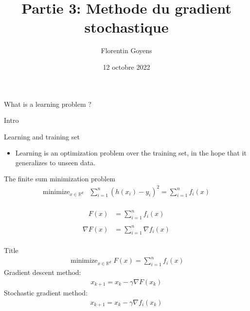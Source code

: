 \documentclass[10pt,serif]{beamer}
\title{Partie 3: Methode du gradient stochastique}
\date{12 octobre 2022}
\author{Florentin Goyens}
\newcommand{\Rd}{\mathbb{R}^d}
\newcommand{\minimize}{\operatorname{minimize}}
\begin{document}
\maketitle

\begin{frame}{What is a learning problem ? }

Intro 

\end{frame}


\begin{frame}{Learning and training set}
\begin{itemize}
\item Learning is an optimization problem over the training set, in the hope that it generalizes to unseen data.  
\end{itemize}
\end{frame}

\begin{frame}{The finite sum minimization problem}
\begin{align*}
 \minimize_{x\in \Rd} &\sum_{i=1}^n (h(x_i) - y_i)^2 =  \sum_{i=1}^n  f_i(x)\\
\end{align*}

\begin{align*}
F(x) &= \sum_{i=1}^n  f_i(x)\\
\end{align*}
\begin{align*}
\nabla F(x) &= \sum_{i=1}^n  \nabla f_i(x)\\
\end{align*}
\end{frame}
\begin{frame}{Title}
\begin{align*}
\minimize_{x\in \Rd} F(x) = \sum_{i=1}^n  f_i(x)
\end{align*}
Gradient descent method:
\begin{align*}
x_{k+1} = x_k - \gamma \nabla F(x_k)
\end{align*}
Stochastic gradient method: 
\begin{align*}
x_{k+1} = x_k - \gamma \nabla f_i(x_k)
\end{align*}
\end{frame}
\end{document}
